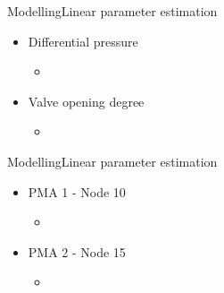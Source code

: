 \begin{frame}{Modelling}{Linear parameter estimation}
\begin{itemize}
	\item<1-> Differential pressure 
	\begin{itemize}
		\item<1->[] 
			\begin{figure}[H]
			\centering
			 
			\end{figure}	
	\end{itemize}	
\end{itemize}

\begin{itemize}
	\item<2-> Valve opening degree
	\begin{itemize}
		\item<2->[] 
			\begin{figure}[H]
			\centering
			 
			\end{figure}	
	\end{itemize}	
\end{itemize}
\end{frame}

\begin{frame}{Modelling}{Linear parameter estimation}
\begin{itemize}
	\item<1-> PMA 1 - Node 10
	\begin{itemize}
		\item<1->[] 
			\begin{figure}[H]
			\centering
			 
			\end{figure}	
	\end{itemize}	
\end{itemize}

\begin{itemize}
	\item<2-> PMA 2 - Node 15
	\begin{itemize}
		\item<2->[] 
			\begin{figure}[H]
			\centering
			 
			\end{figure}	
	\end{itemize}	
\end{itemize}
\end{frame}

